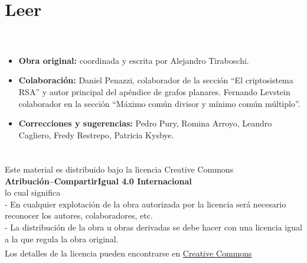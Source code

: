 \documentclass[a4paper,12pt,twoside,spanish,reqno,dottedtoc]{scrbook}
\begin{document}
    \chapter*{Leer}
    
     \\${}^{}$\\ 
    
    \begin{itemize}
        \item \textbf{Obra original:} coordinada y escrita por Alejandro Tiraboschi. 
        \item \textbf{Colaboración: } Daniel Penazzi, colaborador  de la sección ``El criptosistema RSA'' y autor principal del apéndice de grafos planares. Fernando Levstein colaborador en la sección ``Máximo común divisor y mínimo común múltiplo''.   
        \item \textbf{Correcciones y sugerencias:} Pedro Pury, Romina Arroyo, Leandro Cagliero, Fredy Restrepo, Patricia Kysbye. 
    \end{itemize}

\vskip 2cm
    
     \\${}^{}$\\ 
    {\flushleft 
        Este material es distribuido bajo la licencia Creative Commons} \\
    {\center \textbf{Atribución--CompartirIgual 4.0 Internacional}}
    \\ 
    \center  lo cual significa 
    \\
    \flushleft
    - En cualquier explotación de la obra autorizada por la licencia será necesario reconocer los autores, colaboradores, etc.\\
    - La distribución de la obra u obras derivadas se debe hacer con una licencia igual a la que regula la obra original.\\
    ${}^{}$
    \\
    Los detalles de la licencia pueden encontrarse en \href{https://creativecommons.org/licenses/by/4.0/deed.es}{Creative Commons}
    \vskip 1cm 
    \endgroup
    
    
    
    
    \pagestyle{scrheadings} %
    \cleardoublepage %
    \cleardoublepage
    
\end{document}
